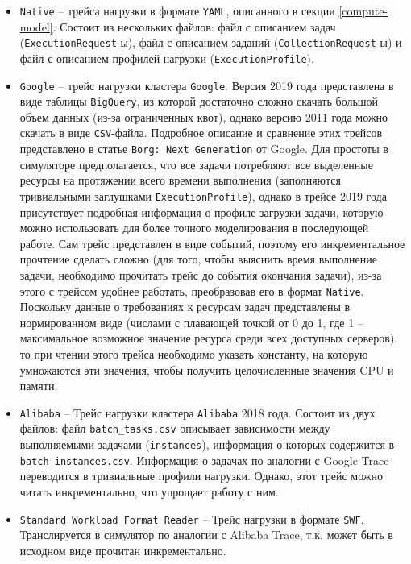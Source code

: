 \begin{itemize}
   \item \texttt{Native} -- трейса нагрузки в формате \texttt{YAML}, описанного в секции \ref{compute-model}. Состоит из нескольких файлов: файл с описанием задач (\texttt{ExecutionRequest}-ы), файл с описанием заданий (\texttt{CollectionRequest}-ы) и файл с описанием профилей нагрузки (\texttt{ExecutionProfile}).
   \item \texttt{Google} -- трейс нагрузки кластера \texttt{Google}\cite{google-clusterdata}. Версия 2019 года представлена в виде таблицы \texttt{BigQuery}, из которой достаточно сложно скачать большой объем данных (из-за ограниченных квот), однако версию 2011 года можно скачать в виде \texttt{CSV}-файла. Подробное описание и сравнение этих трейсов представлено в статье \texttt{Borg: Next Generation}\cite{borg-next-gen} от Google. Для простоты в симуляторе предполагается, что все задачи потребляют все выделенные ресурсы на протяжении всего времени выполнения (заполняются тривиальными заглушками \texttt{ExecutionProfile}), однако в трейсе 2019 года присутствует подробная информация о профиле загрузки задачи, которую можно использовать для более точного моделирования в последующей работе. Сам трейс представлен в виде событий, поэтому его инкрементальное прочтение сделать сложно (для того, чтобы выяснить время выполнение задачи, необходимо прочитать трейс до события окончания задачи), из-за этого с трейсом удобнее работать, преобразовав его в формат \texttt{Native}. Поскольку данные о требованиях к ресурсам задач представлены в нормированном виде (числами с плавающей точкой от 0 до 1, где 1 -- максимальное возможное значение ресурса среди всех доступных серверов), то при чтении этого трейса необходимо указать константу, на которую умножаются эти значения, чтобы получить целочисленные значения CPU и памяти. 
   \item \texttt{Alibaba} -- Трейс нагрузки кластера \texttt{Alibaba} 2018 года\cite{alibaba-clusterdata}. Состоит из двух файлов: файл \texttt{batch\_tasks.csv} описывает зависимости между выполняемыми задачами (\texttt{instances}), информация о которых содержится в \texttt{batch\_instances.csv}. Информация о задачах по аналогии с Google Trace переводится в тривиальные профили нагрузки. Однако, этот трейс можно читать инкрементально, что упрощает работу с ним.  
   \item \texttt{Standard Workload Format Reader} -- Трейс нагрузки в формате \texttt{SWF}\cite{standard-workload-format}. Транслируется в симулятор по аналогии с Alibaba Trace, т.к. может быть в исходном виде прочитан инкрементально. 

\end{itemize}
